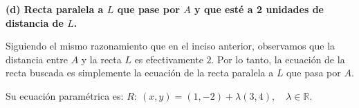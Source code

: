 \documentclass[11pt]{article}
\begin{document}
\begin{enumerate}[\hspace{-5mm} 1) ]

\bigskip  

\textbf{(d) Recta paralela a $L$ que pase por $A$ y que esté a 2 unidades de distancia de $L$.}

Siguiendo el mismo razonamiento que en el inciso anterior, observamos que la distancia entre $A$ y la recta $L$ es efectivamente $2$. Por lo tanto, la ecuación de la recta buscada es simplemente la ecuación de la recta paralela a $L$ que pasa por $A$. 

Su ecuación paramétrica es: \quad$R:\ (x, y) = (1,-2) + \lambda (3, 4),\quad \lambda \in \mathbb{R}.$

\end{enumerate}
\end{document}
